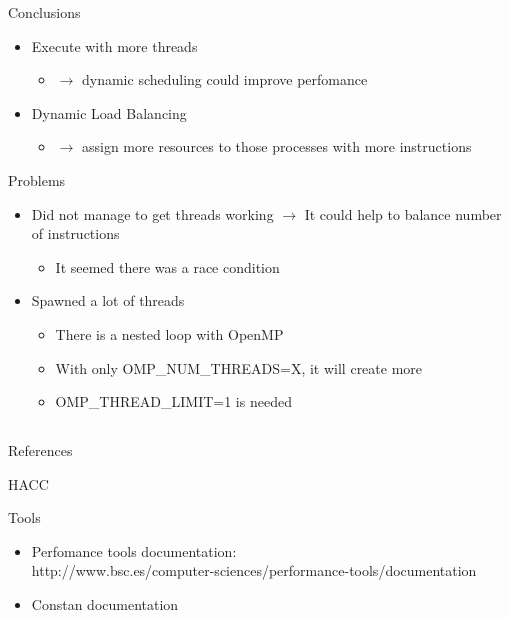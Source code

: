 \documentclass[aspectratio=169]{bredelebeamer}
\begin{document}
\begin{frame}{Conclusions}
\begin{itemize}
\begin{itemize}
	\item Execute with more threads
	\begin{itemize}
		\item[]  $\rightarrow$ dynamic scheduling could improve perfomance
	\end{itemize} 
	
	\item Dynamic Load Balancing 
		\begin{itemize}
		\item[]  $\rightarrow$ assign more resources to those processes with more instructions
	\end{itemize} 
\end{itemize}
\end{itemize}

\end{frame}

\begin{frame}{Problems}
\begin{itemize}
\item Did not manage to get threads working $\rightarrow$ It could help to balance number of instructions
\begin{itemize}
	\item It seemed there was a race condition
\end{itemize}
\vspace{0.5cm}
\item Spawned a lot of threads
	\begin{itemize}
		\item There is a nested loop with OpenMP
		\item With only OMP\_NUM\_THREADS=X, it will create more
		\item OMP\_THREAD\_LIMIT=1 is needed
	\end{itemize}
\end{itemize}


\end{frame}





\subsection{}
\begin{frame}{References}

   \begin{block}{HACC}
      \printbibliography[heading=none]
   \end{block}
   
\begin{block}{Tools}
\begin{itemize}
\item Perfomance tools documentation: \\http://www.bsc.es/computer-sciences/performance-tools/documentation

\item Constan documentation

\end{itemize}
   \end{block}
\end{frame}
\end{document}
